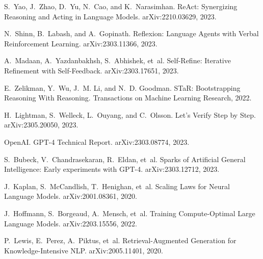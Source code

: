\documentclass[11pt]{article}
\begin{document}
\begin{thebibliography}{99}
S.~Yao, J.~Zhao, D.~Yu, N.~Cao, and K.~Narasimhan.
\newblock ReAct: Synergizing Reasoning and Acting in Language Models.
\newblock arXiv:2210.03629, 2023{}.

N.~Shinn, B.~Labash, and A.~Gopinath.
\newblock Reflexion: Language Agents with Verbal Reinforcement Learning.
\newblock arXiv:2303.11366, 2023.

A.~Madaan, A.~Yazdanbakhsh, S.~Abhishek, et~al.
\newblock Self-Refine: Iterative Refinement with Self-Feedback.
\newblock arXiv:2303.17651, 2023.

E.~Zelikman, Y.~Wu, J.~M. Li, and N.~D. Goodman.
\newblock STaR: Bootstrapping Reasoning With Reasoning.
\newblock Transactions on Machine Learning Research, 2022.

H.~Lightman, S.~Welleck, L.~Ouyang, and C.~Olsson.
\newblock Let's Verify Step by Step.
\newblock arXiv:2305.20050, 2023.

OpenAI.
\newblock GPT-4 Technical Report.
\newblock arXiv:2303.08774, 2023.

S.~Bubeck, V.~Chandrasekaran, R.~Eldan, et~al.
\newblock Sparks of Artificial General Intelligence: Early experiments with
  GPT-4.
\newblock arXiv:2303.12712, 2023.

J.~Kaplan, S.~McCandlish, T.~Henighan, et~al.
\newblock Scaling Laws for Neural Language Models.
\newblock arXiv:2001.08361, 2020.

J.~Hoffmann, S.~Borgeaud, A.~Mensch, et~al.
\newblock Training Compute-Optimal Large Language Models.
\newblock arXiv:2203.15556, 2022.

P.~Lewis, E.~Perez, A.~Piktus, et~al.
\newblock Retrieval-Augmented Generation for Knowledge-Intensive NLP.
\newblock arXiv:2005.11401, 2020.


\end{thebibliography}
\end{document}
